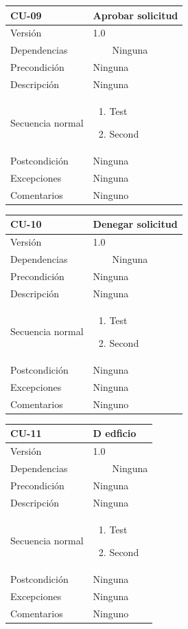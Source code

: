 \documentclass[12pt, a4paper, twoside]{article}
\newcommand{\tabitem}{~~\llap{\textbullet}~~}
\begin{document}
\begin{longtable}{ |l|l| }
  \hline
  CU-09 & Aprobar solicitud \\ \hline
  Versión & 1.0 \\ \hline
  Dependencias & 
    \tabitem Ninguna \\ \hline
  Precondición & Ninguna \\ \hline
  Descripción & Ninguna \\ \hline
  Secuencia normal & 
  \parbox{.45\textwidth}{
    \begin{enumerate}
      \item Test
      \item Second
    \end{enumerate}
  } \\ \hline
  Postcondición & Ninguna \\ \hline
  Excepciones & Ninguna \\ \hline
  Comentarios & Ninguno \\ \hline
\end{longtable}

\begin{longtable}{ |l|l| }
  \hline
  CU-10 & Denegar solicitud \\ \hline
  Versión & 1.0 \\ \hline
  Dependencias & 
    \tabitem Ninguna \\ \hline
  Precondición & Ninguna \\ \hline
  Descripción & Ninguna \\ \hline
  Secuencia normal & 
  \parbox{.45\textwidth}{
    \begin{enumerate}
      \item Test
      \item Second
    \end{enumerate}
  } \\ \hline
  Postcondición & Ninguna \\ \hline
  Excepciones & Ninguna \\ \hline
  Comentarios & Ninguno \\ \hline
\end{longtable}

\begin{longtable}{ |l|l| }
  \hline
  CU-11 & D edficio \\ \hline
  Versión & 1.0 \\ \hline
  Dependencias & 
    \tabitem Ninguna \\ \hline
  Precondición & Ninguna \\ \hline
  Descripción & Ninguna \\ \hline
  Secuencia normal & 
  \parbox{.45\textwidth}{
    \begin{enumerate}
      \item Test
      \item Second
    \end{enumerate}
  } \\ \hline
  Postcondición & Ninguna \\ \hline
  Excepciones & Ninguna \\ \hline
  Comentarios & Ninguno \\ \hline
\end{longtable}
\end{document}
